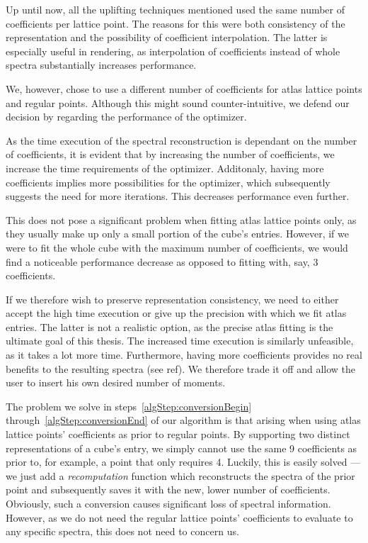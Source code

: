Up until now, all the uplifting techniques mentioned used the same number of coefficients per lattice point. The reasons for this were both consistency of the representation and the possibility of coefficient interpolation. The latter is especially useful in rendering, as interpolation of coefficients instead of whole spectra substantially increases performance.

We, however, chose to use a different number of coefficients for atlas lattice points and regular points. Although this might sound counter-intuitive, we defend our decision by regarding the performance of the optimizer.

As the time execution of the spectral reconstruction is dependant on the number of coefficients, it is evident that by increasing the number of coefficients, we increase the time requirements of the optimizer. Additonaly, having more coefficients implies more possibilities for the optimizer, which subsequently suggests the need for more iterations. This decreases performance even further.

This does not pose a significant problem when fitting atlas lattice points only, as they usually make up only a small portion of the cube's entries. However, if we were to fit the whole cube with the maximum number of coefficients, we would find a noticeable performance decrease as opposed to fitting with, say, 3 coefficients.

If we therefore wish to preserve representation consistency, we need to either accept the high time execution or give up the precision with which we fit atlas entries. The latter is not a realistic option, as the precise atlas fitting is the ultimate goal of this thesis. The increased time execution is similarly unfeasible, as it takes a lot more time. Furthermore, having more coefficients provides no real benefits to the resulting spectra (see ref). We therefore trade it off and allow the user to insert his own desired number of moments.

The problem we solve in steps~\ref{algStep:conversionBegin} through~\ref{algStep:conversionEnd} of our algorithm is that arising when using atlas lattice points' coefficients as prior to regular points. By supporting two distinct representations of a cube's entry, we simply cannot use the same 9 coefficients as prior to, for example, a point that only requires 4. Luckily, this is easily solved --- we just add a \emph{recomputation} function which reconstructs the spectra of the prior point and subsequently saves it with the new, lower number of coefficients. Obviously, such a conversion causes significant loss of spectral information. However, as we do not need the regular lattice points' coefficients to evaluate to any specific spectra, this does not need to concern us.


